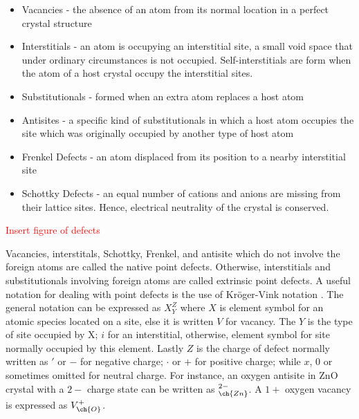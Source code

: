 \begin{itemize}
	\item Vacancies - the absence of an atom from its normal location in a perfect crystal structure
	\item Interstitials - an atom is occupying an interstitial site, a small void space that under ordinary circumstances is not occupied. Self-interstitials are form when the atom of a host crystal occupy the interstitial sites.
	\item Substitutionals - formed when an extra atom replaces a host atom
	\item Antisites - a specific kind of substitutionals in which a host atom occupies the site which was originally occupied by another type of host atom
	\item Frenkel Defects - an atom displaced from its position to a nearby interstitial site
	\item Schottky Defects - an equal  number  of  cations  and anions  are missing  from  their  lattice  sites. Hence,  electrical  neutrality  of  the  crystal is conserved.

\end{itemize}

\textcolor{red}{Insert figure of defects}

Vacancies, interstitals, Schottky, Frenkel, and antisite which do not involve the foreign atoms are called the native point defects. Otherwise, interstitials and substitutionals involving foreign atoms are called extrinsic point defects. A useful notation for dealing with point defects is the use of  Kröger-Vink notation \citep{Kroeger1964}. The general notation can  be expressed as  $X_Y^Z$ where $X$ is element symbol for an atomic species located on a site, else it is written $V$ for vacancy. The $Y$ is the type of site occupied by X; $i$ for an interstitial, otherwise, element symbol for site normally occupied by this element. Lastly $Z$ is the charge of defect normally written as $'$ or $-$ for negative charge; $\cdot$ or $+$ for positive charge; while $x$, $0$ or sometimes omitted for neutral charge. For instance, an oxygen antisite in ZnO crystal with a $2-$ charge state can be written as $_{\ch{Zn}}^{2-}$. A $1+$ oxygen vacancy is expressed as $V_{\ch{O}}^{+}$.

